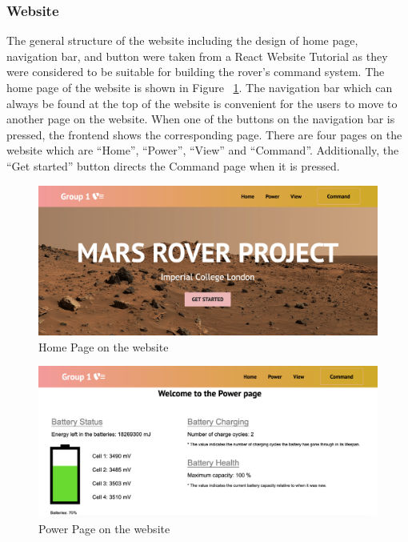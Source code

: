 \documentclass[a4paper]{article}
\begin{document}
\subsubsection{Website}

The general structure of the website including the design of home page, navigation bar, and button 
were taken from a React Website Tutorial \cite{ReactTutorial} as they were considered to be suitable 
for building the rover’s command system. The home page of the website is shown in Figure ~\ref{fig:homepage}. The 
navigation bar which can always be found at the top of the website is convenient for the users to 
move to another page on the website. When one of the buttons on the navigation bar is pressed, the 
frontend shows the corresponding page. There are four pages on the website which are “Home”, “Power”, 
“View” and “Command”. Additionally, the “Get started” button directs the Command page when it is pressed. 

\begin{figure}[H]
	\begin{Center}
		\includegraphics[width = \linewidth]{./images/HomePage.png}
		\caption{Home Page on the website}
        \label{fig:homepage}
	\end{Center}
\end{figure}

\begin{figure}[H]
	\begin{Center}
		\includegraphics[width = \linewidth]{./images/PowerPage.png}
		\caption{Power Page on the website}
        \label{fig:powerpage}
	\end{Center}
\end{figure}
\end{document}
